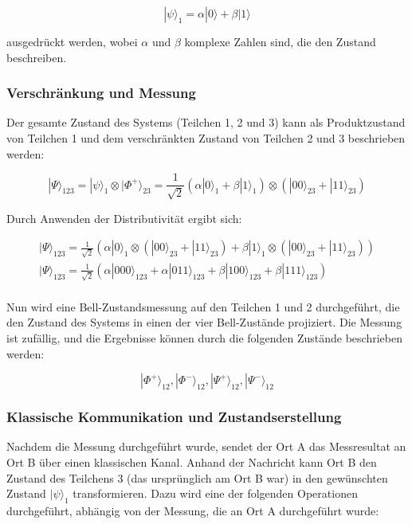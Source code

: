 \[
|\psi\rangle_1 = \alpha |0\rangle + \beta |1\rangle
\]

ausgedrückt werden, wobei \(\alpha\) und \(\beta\) komplexe Zahlen sind, die den Zustand beschreiben.

\subsubsection{Verschränkung und Messung}

Der gesamte Zustand des Systems (Teilchen 1, 2 und 3) kann als Produktzustand von Teilchen 1 und dem verschränkten Zustand von Teilchen 2 und 3 beschrieben werden:

\[
|\Psi\rangle_{123} = |\psi\rangle_1 \otimes |\Phi^+\rangle_{23} = \frac{1}{\sqrt{2}} \left( \alpha |0\rangle_1 + \beta |1\rangle_1 \right) \otimes \left( |00\rangle_{23} + |11\rangle_{23} \right)
\]

Durch Anwenden der Distributivität ergibt sich:

\begin{gather*}
    |\Psi\rangle_{123} = \frac{1}{\sqrt{2}} \left( \alpha |0\rangle_1 \otimes (|00\rangle_{23} + |11\rangle_{23}) + \beta |1\rangle_1 \otimes (|00\rangle_{23} + |11\rangle_{23}) \right)\\
    |\Psi\rangle_{123} = \frac{1}{\sqrt{2}} \left( \alpha |000\rangle_{123} + \alpha |011\rangle_{123} + \beta |100\rangle_{123} + \beta |111\rangle_{123} \right)\\
\end{gather*}

Nun wird eine Bell-Zustandsmessung auf den Teilchen 1 und 2 durchgeführt, die den Zustand des Systems in einen der vier Bell-Zustände projiziert. Die Messung ist zufällig, und die Ergebnisse können durch die folgenden Zustände beschrieben werden:

\[
|\Phi^+\rangle_{12}, |\Phi^-\rangle_{12}, |\Psi^+\rangle_{12}, |\Psi^-\rangle_{12}
\]

\subsubsection*{Klassische Kommunikation und Zustandserstellung}

Nachdem die Messung durchgeführt wurde, sendet der Ort A das Messresultat an Ort B über einen klassischen Kanal. Anhand der Nachricht kann Ort B den Zustand des Teilchens 3 (das ursprünglich am Ort B war) in den gewünschten Zustand \(|\psi\rangle_1\) transformieren. Dazu wird eine der folgenden Operationen durchgeführt, abhängig von der Messung, die an Ort A durchgeführt wurde:


